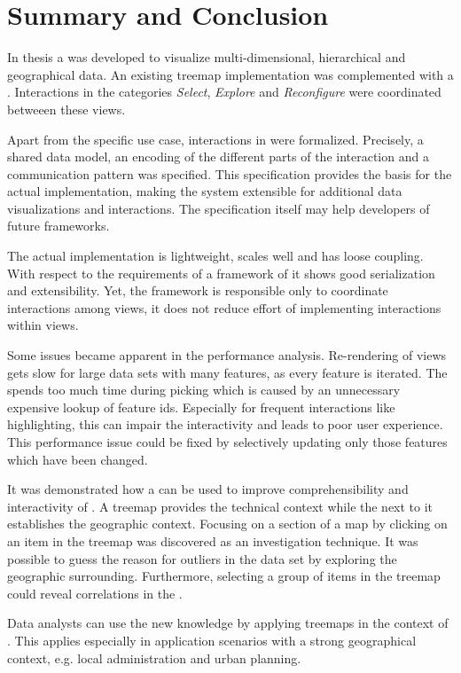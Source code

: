 \chapter{Summary and Conclusion}\label{sec:conclusion}

In thesis a \cmv{} was developed to visualize multi-dimensional, hierarchical and geographical data.
An existing treemap implementation was complemented with a \gv{}.
Interactions in the categories \emph{Select}, \emph{Explore} and \emph{Reconfigure} were coordinated betweeen these views.

Apart from the specific use case, interactions in \cmvs{} were formalized.
Precisely, a shared data model, an encoding of the different parts of the interaction and a communication pattern was specified.
This specification provides the basis for the actual implementation, making the system extensible for additional data visualizations and interactions.
The specification itself may help developers of future \cmv{} frameworks.

The actual implementation is lightweight, scales well and has loose coupling.
With respect to the requirements of a framework of \cmvs{} it shows good serialization and extensibility.
Yet, the framework is responsible only to coordinate interactions among views, it does not reduce effort of implementing interactions within views.

Some issues became apparent in the performance analysis.
Re-rendering of views gets slow for large data sets with many features, as every feature is iterated.
The \tmap{} spends too much time during picking which is caused by an unnecessary expensive lookup of feature ids.
Especially for frequent interactions like highlighting, this can impair the interactivity and leads to poor user experience.
This performance issue could be fixed by selectively updating only those features which have been changed.

It was demonstrated how a \cmv{} can be used to improve comprehensibility and interactivity of \tmaps{}.
A treemap provides the technical context while the \gv{} next to it establishes the geographic context.
Focusing on a section of a map by clicking on an item in the treemap was discovered as an investigation technique.
It was possible to guess the reason for outliers in the data set by exploring the geographic surrounding.
Furthermore, selecting a group of items in the treemap could reveal correlations in the \gv{}.

Data analysts can use the new knowledge by applying treemaps in the context of \dss{}.
This applies especially in application scenarios with a strong geographical context, e.g. local administration and urban planning.


